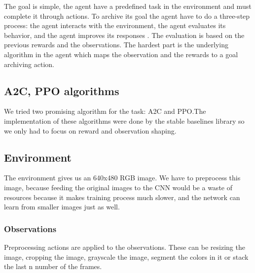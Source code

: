 \documentclass{article}
\begin{document}
The goal is simple, the agent have a predefined task in the environment and must complete it through actions. To archive its goal the agent have to do a three-step process: the agent interacts with the environment, the agent evaluates its behavior, and the agent improves its responses \cite{dlr_book}. The evaluation is based on the previous rewards and the observations. The hardest part is the underlying algorithm in the agent which maps the observation and the rewards to a goal archiving action.

\subsection{\normalsize{A2C, PPO algorithms}}

We tried two promising algorithm for the task: A2C and PPO.The implementation of these algorithms were done by the stable baselines library  \cite{stablebase} so we only had to focus on reward and observation shaping.

\subsection{\normalsize{Environment}}

The environment gives us an 640x480 RGB image.
We have to preprocess this image, because feeding the original images to the CNN would be a waste of resources because it makes training process much slower, and the network can learn from smaller images just as well.

\subsubsection{\normalsize{Observations}}

Preprocessing actions are applied to the observations. These can be resizing the image, cropping the image, grayscale the image, segment the colors in it or stack the last n number of the frames.
\end{document}
